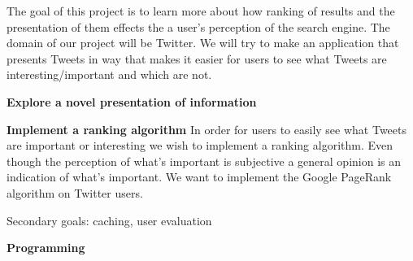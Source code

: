 The goal of this project is to learn more about how ranking of results and the presentation of them effects the a user's perception of the search engine. The domain of our project will be Twitter. We will try to make an application that presents Tweets in way that makes it easier for users to see what Tweets are interesting/important and which are not. 

{\bf Explore a novel presentation of information}\newline


{\bf Implement a ranking algorithm}\newline
In order for users to easily see what Tweets are important or interesting we wish to implement a ranking algorithm. Even though the perception of what's important is subjective a general opinion is an indication of what's important. We want to implement the Google PageRank algorithm on Twitter users.

Secondary goals: caching, user evaluation

{\bf Programming}\newline

